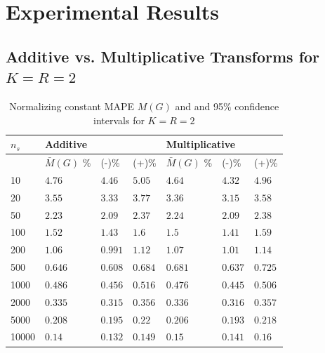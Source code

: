 \chapter{Experimental Results}\label{app:extra_experiments}

\section{Additive vs. Multiplicative Transforms for \(K=R=2\)}

\begin{table}[H]
\begin{center}
    \begin{tabular}{@{}lllllll@{}}
    \toprule
     \(n_s\) & \multicolumn{3}{l}{Additive} & \multicolumn{3}{l}{Multiplicative} \\ \midrule
        & \(\bar{M}(G)\) \% & (-)\% & (+)\% & \(\bar{M}(G)\) \% & (-)\% & (+)\%  \\ \midrule
        10 &\(4.76\) & \(4.46\) & \(5.05\) & \(4.64\) & \(4.32\) & \(4.96\) \\ 
        20 &\(3.55\) & \(3.33\) & \(3.77\) & \(3.36\) & \(3.15\) & \(3.58\) \\ 
        50 &\(2.23\) & \(2.09\) & \(2.37\) & \(2.24\) & \(2.09\) & \(2.38\) \\ 
        100 &\(1.52\) & \(1.43\) & \(1.6\) & \(1.5\) & \(1.41\) & \(1.59\) \\ 
        200 &\(1.06\) & \(0.991\) & \(1.12\) & \(1.07\) & \(1.01\) & \(1.14\) \\ 
        500 &\(0.646\) & \(0.608\) & \(0.684\) & \(0.681\) & \(0.637\) & \(0.725\) \\ 
        1000 &\(0.486\) & \(0.456\) & \(0.516\) & \(0.476\) & \(0.445\) & \(0.506\) \\ 
        2000 &\(0.335\) & \(0.315\) & \(0.356\) & \(0.336\) & \(0.316\) & \(0.357\) \\ 
        5000 &\(0.208\) & \(0.195\) & \(0.22\) & \(0.206\) & \(0.193\) & \(0.218\) \\ 
        10000 &\(0.14\) & \(0.132\) & \(0.149\) & \(0.15\) & \(0.141\) & \(0.16\) \\   \bottomrule
    \end{tabular}
\end{center}
\caption{Normalizing constant MAPE \(M(G)\) and and 95\(\%\) confidence intervals for \(K=R=2\)}
\label{tab:NC_MAPE_transforms_KR2}
\end{table}

\newpage

